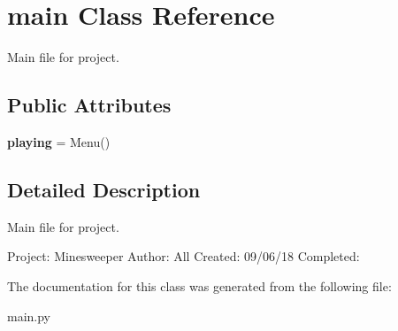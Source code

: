 \hypertarget{classmain}{}\section{main Class Reference}
\label{classmain}


Main file for project.  


\subsection*{Public Attributes}
\begin{DoxyCompactItemize}
\item 
\mbox{\label{classmain_a445c3e22435e5e1405575fd92ee93a3e}} 
{\bfseries playing} = Menu()
\end{DoxyCompactItemize}


\subsection{Detailed Description}
Main file for project. 

Project\+: Minesweeper Author\+: All Created\+: 09/06/18 Completed\+: 

The documentation for this class was generated from the following file\+:\begin{DoxyCompactItemize}
\item 
main.\+py\end{DoxyCompactItemize}
